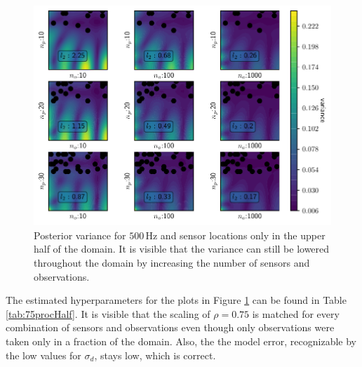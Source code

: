 \documentclass[%
  a4paper,oneside,%
  11pt,%
  smallchapters,
  style=printdev,
  extramargin,
  green,%
  rgb, <cmyk>
  ]{tubsbook}
\begin{document}
\begin{figure}[!ht]
\includegraphics[width=1\textwidth]{../../Python/Results/2D/HalfSide/4/VarField_Posterior.pdf}
\centering
\caption{Posterior variance for $500 \,\mathrm{Hz}$ and sensor locations only in the upper half of the domain. It is visible that the variance can still be lowered throughout the domain by increasing the number of sensors and observations.}
\label{fig:VarianceHalfSided2D3t3}
\end{figure}

The estimated hyperparameters for the plots in Figure \ref{fig:VarianceHalfSided2D3t3} can be found in Table \ref{tab:75procHalf}. It is visible that the scaling of $\rho=0.75$ is matched for every combination of sensors and observations even though only observations were taken only in a fraction of the domain. Also, the the model error, recognizable by the low values for $\sigma_d$, stays low, which is correct.
\end{document}
